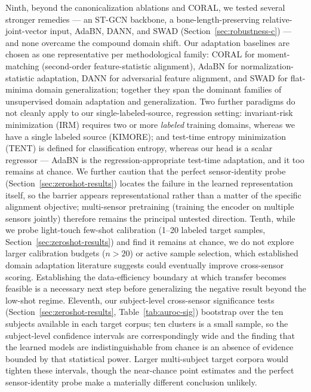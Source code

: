 \documentclass[10pt,journal]{IEEEtran}
\begin{document}
Ninth, beyond the canonicalization ablations and CORAL, we tested several stronger remedies --- an ST-GCN backbone, a bone-length-preserving relative-joint-vector input, AdaBN, DANN, and SWAD (Section~\ref{sec:robustness-c}) --- and none overcame the compound domain shift. Our adaptation baselines are chosen as one representative per methodological family: CORAL \cite{sun2016deep} for moment-matching (second-order feature-statistic alignment), AdaBN \cite{li2018adabn} for normalization-statistic adaptation, DANN \cite{ganin2016dann} for adversarial feature alignment, and SWAD \cite{cha2021swad} for flat-minima domain generalization; together they span the dominant families of unsupervised domain adaptation and generalization. Two further paradigms do not cleanly apply to our single-labeled-source, regression setting: invariant-risk minimization (IRM) \cite{arjovsky2019irm} requires two or more \emph{labeled} training domains, whereas we have a single labeled source (KIMORE); and test-time entropy minimization (TENT) \cite{wang2021tent} is defined for classification entropy, whereas our head is a scalar regressor --- AdaBN is the regression-appropriate test-time adaptation, and it too remains at chance. We further caution that the perfect sensor-identity probe (Section~\ref{sec:zeroshot-results}) locates the failure in the learned representation itself, so the barrier appears representational rather than a matter of the specific alignment objective; multi-sensor pretraining (training the encoder on multiple sensors jointly) therefore remains the principal untested direction. Tenth, while we probe light-touch few-shot calibration (1--20 labeled target samples, Section~\ref{sec:zeroshot-results}) and find it remains at chance, we do not explore larger calibration budgets ($n > 20$) or active sample selection, which established domain adaptation literature suggests could eventually improve cross-sensor scoring. Establishing the data-efficiency boundary at which transfer becomes feasible is a necessary next step before generalizing the negative result beyond the low-shot regime. Eleventh, our subject-level cross-sensor significance tests (Section~\ref{sec:zeroshot-results}, Table~\ref{tab:auroc-sig}) bootstrap over the ten subjects available in each target corpus; ten clusters is a small sample, so the subject-level confidence intervals are correspondingly wide and the finding that the learned models are indistinguishable from chance is an absence of evidence bounded by that statistical power. Larger multi-subject target corpora would tighten these intervals, though the near-chance point estimates and the perfect sensor-identity probe make a materially different conclusion unlikely.
\end{document}
